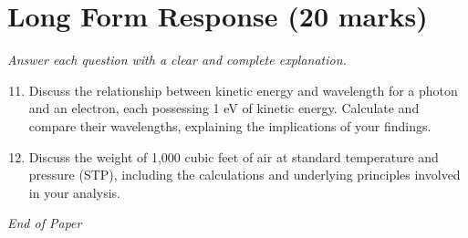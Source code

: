 \documentclass[12pt]{article}
\begin{document}
\section*{Long Form Response (20 marks)}
\textit{Answer each question with a clear and complete explanation.}
\begin{enumerate}[label=\arabic*.]
\setcounter{enumi}{10}
\item Discuss the relationship between kinetic energy and wavelength for a photon and an electron, each possessing 1 eV of kinetic energy. Calculate and compare their wavelengths, explaining the implications of your findings.
\item Discuss the weight of 1,000 cubic feet of air at standard temperature and pressure (STP), including the calculations and underlying principles involved in your analysis.
\end{enumerate}

\vfill
\noindent\textit{End of Paper}
\end{document}

